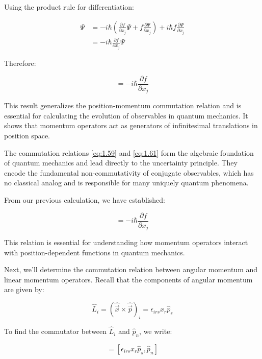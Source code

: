 \documentclass[italian]{HKNdocument}
\begin{document}
Using the product rule for differentiation:

\begin{align}
[\hat{p}_j, f]\Psi &= -i\hbar\left(\frac{\partial f}{\partial x_j}\Psi + f\frac{\partial\Psi}{\partial x_j}\right) + i\hbar f\frac{\partial\Psi}{\partial x_j} \label{eq:1.61} \\
&= -i\hbar\frac{\partial f}{\partial x_j}\Psi
\end{align}

Therefore:

\begin{equation}
[\hat{p}_j, f] = -i\hbar\frac{\partial f}{\partial x_j}
\end{equation}

This result generalizes the position-momentum commutation relation and is essential for calculating the evolution of observables in quantum mechanics. It shows that momentum operators act as generators of infinitesimal translations in position space.

The commutation relations \eqref{eq:1.59} and \eqref{eq:1.61} form the algebraic foundation of quantum mechanics and lead directly to the uncertainty principle. They encode the fundamental non-commutativity of conjugate observables, which has no classical analog and is responsible for many uniquely quantum phenomena.


From our previous calculation, we have established:

\begin{equation}
[\hat{p}_j, f] = -i\hbar\frac{\partial f}{\partial x_j} \label{eq:1.62}
\end{equation}

This relation is essential for understanding how momentum operators interact with position-dependent functions in quantum mechanics.

Next, we'll determine the commutation relation between angular momentum and linear momentum operators. Recall that the components of angular momentum are given by:

\begin{equation}
\hat{L}_i = (\hat{\vec{x}} \times \hat{\vec{p}})_i = \epsilon_{irs}x_r\hat{p}_s \label{eq:1.63}
\end{equation}

To find the commutator between $\hat{L}_i$ and $\hat{p}_n$, we write:

\begin{equation}
[\hat{L}_i, \hat{p}_n] = [\epsilon_{irs}x_r\hat{p}_s, \hat{p}_n] \label{eq:1.64}
\end{equation}
\end{document}
